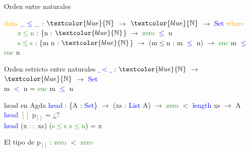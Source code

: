 \documentclass[xcolor=dvipsnames]{beamer} %
\newcommand{\cf}[1]{\textcolor{blue}{#1}}
\newcommand{\ct}[1]{\textcolor{blue}{#1}}
\newcommand{\cc}[1]{\textcolor{ForestGreen}{#1}}
\newcommand{\ck}[1]{\textcolor{orange}{#1}}
\newcommand{\N}{\ct{\mathbb{N}}}
\newcommand{\ra}{\rightarrow}
\begin{document}
\begin{frame}

\begin{block}{Orden entre naturales}

\ck{data} \ct{\_$\leq$\_} : $\N$ $\ra$ $\N$ $\ra$ \ct{Set} \ck{where}\\
\ \ \ \ \cc{z$\leq$n} : \{n : $\N$\}                 $\ra$ \cc{zero}  \ct{$\leq$} n\\
\ \ \ \ \cc{s$\leq$s} : \{m n : $\N$\} $\ra$ (m$\leq$n : m \ct{$\leq$} n) $\ra$ \cc{suc} m \ct{$\leq$} \cc{suc} n

\end{block}

\begin{block}{Orden estricto entre naturales}
\cf{$\_<\_$} : $\N$ $\ra$ $\N$ $\ra$ \ct{Set}\\
m \cf{$<$} n = \cc{suc} m \cf{$\leq$} n
\end{block}

\begin{block}{head en Agda}
    \cf{head} : \{A : \ct{Set}\}  $\ra$ (xs : \ct{List} A) $\ra$ 
    \cc{zero} $<$ \ct{length} xs $\rightarrow$ A \\
    \cf{head} \cc{$[]$} p$_{[]}$ = ¿?\\
    \cf{head} (x \cc{$::$} xs) (\cc{s$\leq$s} \cc{z$\leq$n}) = x
  \end{block}  

\begin{block}{}
El tipo de p$_{[]}$ : \cc{zero} $<$ \cc{zero}
\end{block}

\end{frame}
\end{document}
